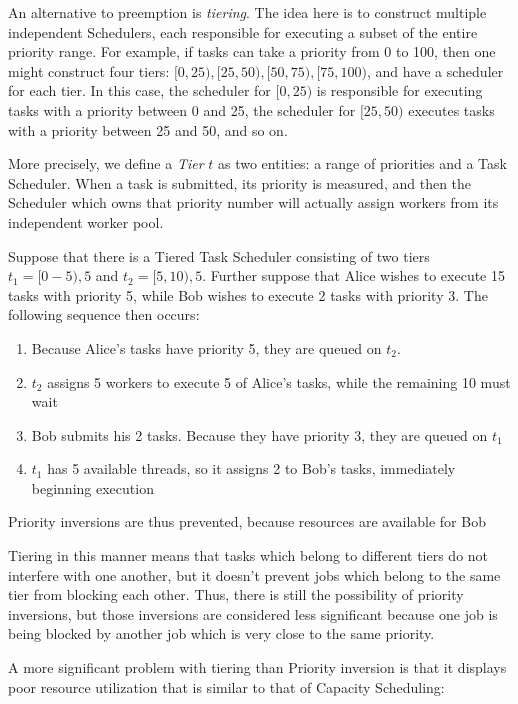 An alternative to preemption is \emph{tiering}. The idea here is to construct multiple independent Schedulers, each responsible for executing a subset of the entire priority range. For example, if tasks can take a priority from 0 to 100, then one might construct four tiers: $[0,25),[25,50),[50,75),[75,100)$, and have a scheduler for each tier. In this case, the scheduler for $[0,25)$ is responsible for executing tasks with a priority between 0 and 25, the scheduler for $[25,50)$ executes tasks with a priority between 25 and 50, and so on.

More precisely, we define a \emph{Tier} $t$ as two entities: a range of priorities and a Task Scheduler. When a task is submitted, its priority is measured, and then the Scheduler which owns that priority number will actually assign workers from its independent worker pool. 

\begin{exmp}
Suppose that there is a Tiered Task Scheduler consisting of two tiers $t_1 = {[0-5),5}$ and $t_2 = {[5,10),5}$. Further suppose that Alice wishes to execute 15 tasks with priority 5, while Bob wishes to execute 2 tasks with priority 3. The following sequence then occurs:

\begin{enumerate}
\item Because Alice's tasks have priority 5, they are queued on $t_2$.
\item $t_2$ assigns 5 workers to execute 5 of Alice's tasks, while the remaining 10 must wait
\item Bob submits his 2 tasks. Because they have priority 3, they are queued on $t_1$
\item $t_1$ has 5 available threads, so it assigns 2 to Bob's tasks, immediately beginning execution
\end{enumerate}
Priority inversions are thus prevented, because resources are available for Bob
\end{exmp}

Tiering in this manner means that tasks which belong to different tiers do not interfere with one another, but it doesn't prevent jobs which belong to the same tier from blocking each other. Thus, there is still the possibility of priority inversions, but those inversions are considered less significant because one job is being blocked by another job which is very close to the same priority.

A more significant problem with tiering than Priority inversion is that it displays poor resource utilization that is similar to that of Capacity Scheduling:


